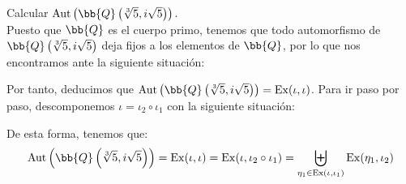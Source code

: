 \begin{ejercicio}
    Calcular $\Aut\left(\bb{Q}\left(\sqrt[3]{5},i\sqrt{5}\right)\right)$.\\

    Puesto que $\bb{Q}$ es el cuerpo primo, tenemos que todo automorfismo de $\bb{Q}\left(\sqrt[3]{5},i\sqrt{5}\right)$ deja fijos a los elementos de $\bb{Q}$, por lo que nos encontramos ante la siguiente situación:
    \begin{figure}[H]
        \centering
    \end{figure}

    Por tanto, deducimos que $\Aut\left(\bb{Q}\left(\sqrt[3]{5},i\sqrt{5}\right)\right) = \Ex(\iota, \iota)$. Para ir paso por paso, descomponemos $\iota=\iota_2\circ \iota_1$ con la siguiente situación:
    \begin{figure}[H]
        \centering
    \end{figure}

    De esta forma, tenemos que:
    \begin{equation*}
        \Aut\left(\bb{Q}\left(\sqrt[3]{5},i\sqrt{5}\right)\right) = \Ex(\iota, \iota) = \Ex(\iota, \iota_2\circ \iota_1) = \biguplus_{\eta_1\in \Ex(\iota, \iota_1)} \Ex(\eta_1, \iota_2)
    \end{equation*}


\end{ejercicio}
